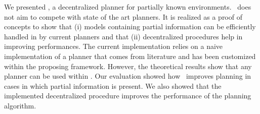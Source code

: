 We presented  \toolName, a  decentralized planner for partially known environments.
\toolName\ does not aim to compete with state of the art planners.
It is realized as a proof of concepts to show that (i) models containing partial information can be efficiently handled in by current planners and that (ii) decentralized procedures help in improving performances.
The current implementation relies on a naive implementation of a planner that comes from literature and has been customized within the proposing framework.
However, the theoretical results show that  any planner can be used within \toolName.
Our evaluation showed how  \toolName\ improves planning in cases in which partial information is present.
We also showed that the implemented decentralized procedure improves the performance of the planning algorithm.
